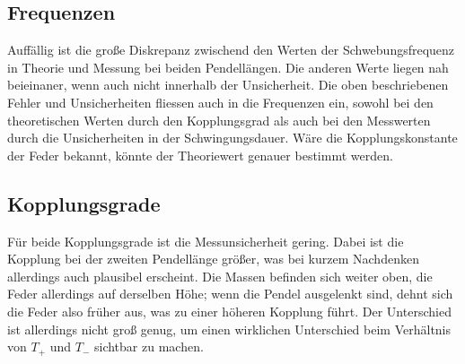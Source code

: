 \subsection{Frequenzen}
Auffällig ist die große Diskrepanz zwischend den Werten der Schwebungsfrequenz in Theorie und Messung bei beiden Pendellängen. Die anderen Werte liegen nah beieinaner, wenn auch nicht innerhalb
der Unsicherheit. 
Die oben beschriebenen Fehler und Unsicherheiten fliessen auch in die Frequenzen ein, sowohl bei den theoretischen Werten durch den Kopplungsgrad als auch bei den 
Messwerten durch die Unsicherheiten in der Schwingungsdauer. Wäre die Kopplungskonstante der Feder bekannt, könnte der Theoriewert genauer bestimmt werden. 


\subsection{Kopplungsgrade}
Für beide Kopplungsgrade ist die Messunsicherheit gering. Dabei ist die Kopplung bei der zweiten Pendellänge größer, was bei kurzem Nachdenken allerdings auch plausibel erscheint.
Die Massen befinden sich weiter oben, die Feder allerdings auf derselben Höhe; wenn die Pendel ausgelenkt sind, dehnt sich die Feder also früher aus, was zu einer höheren
Kopplung führt. Der Unterschied ist allerdings nicht groß genug, um einen wirklichen Unterschied beim Verhältnis von $T_{+}$ und $T_{-}$ sichtbar zu machen.